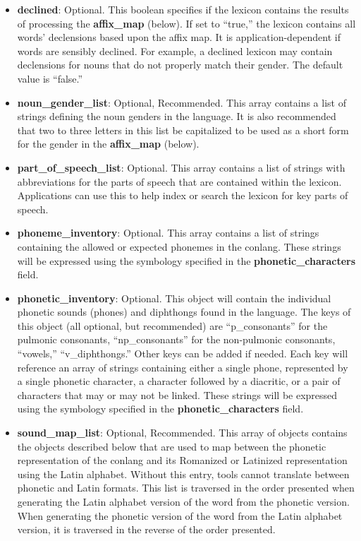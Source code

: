 \begin{itemize}
	\item \textbf{declined}: Optional. This boolean specifies if the lexicon contains the results of processing the \textbf{affix\_map} (below). If set to ``true,'' the lexicon contains all words' declensions based upon the affix map.  It is application-dependent if words are sensibly declined.  For example, a declined lexicon may contain declensions for nouns that do not properly match their gender.  The default value is ``false.''
	\item \textbf{noun\_gender\_list}: Optional, Recommended. This array contains a list of strings defining the noun genders in the language.  It is also recommended that two to three letters in this list be capitalized to be used as a short form for the gender in the \textbf{affix\_map} (below).
	\item \textbf{part\_of\_speech\_list}: Optional.  This array contains a list of strings with abbreviations for the parts of speech that are contained within the lexicon.  Applications can use this to help index or search the lexicon for key parts of speech.
	\item \textbf{phoneme\_inventory}: Optional. This array contains a list of strings containing the allowed or expected phonemes in the conlang.  These strings will be expressed using the symbology specified in the \textbf{phonetic\_characters} field.
	\item \textbf{phonetic\_inventory}: Optional. This object will contain the individual phonetic sounds (phones) and diphthongs found in the language.  The keys of this object (all optional, but recommended) are ``p\_consonants'' for the pulmonic consonants, ``np\_consonants'' for the non-pulmonic consonants, ``vowels,'' ``v\_diphthongs.''  Other keys can be added if needed.  Each key will reference an array of strings containing either a single phone, represented by a single phonetic character, a character followed by a diacritic, or a pair of characters that may or may not be linked.  These strings will be expressed using the symbology specified in the \textbf{phonetic\_characters} field.
	\item \textbf{sound\_map\_list}: Optional, Recommended. This array of objects contains the objects described below that are used to map between the phonetic representation of the conlang and its Romanized or Latinized representation using the Latin alphabet.  Without this entry, tools cannot translate between phonetic and Latin formats.  This list is traversed in the order presented when generating the Latin alphabet version of the word from the phonetic version.  When generating the phonetic version of the word from the Latin alphabet version, it is traversed in the reverse of the order presented.

\end{itemize}
